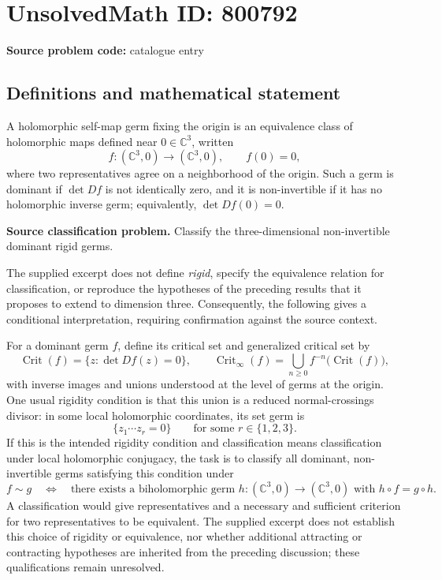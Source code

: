 \documentclass[11pt]{article}
\newcommand{\C}{\mathbb{C}}
\begin{document}
\section*{UnsolvedMath ID: 800792}
\textbf{Source problem code:} catalogue entry
\subsection{Definitions and mathematical statement}
A holomorphic self-map germ fixing the origin is an equivalence class of holomorphic maps defined near \(0\in\C^3\), written
\[
f:(\C^3,0)\longrightarrow(\C^3,0),\qquad f(0)=0,
\]
where two representatives agree on a neighborhood of the origin. Such a germ is dominant if \(\det Df\) is not identically zero, and it is non-invertible if it has no holomorphic inverse germ; equivalently, \(\det Df(0)=0\).

\textbf{Source classification problem.} Classify the three-dimensional non-invertible dominant rigid germs.

The supplied excerpt does not define \emph{rigid}, specify the equivalence relation for classification, or reproduce the hypotheses of the preceding results that it proposes to extend to dimension three. Consequently, the following gives a conditional interpretation, requiring confirmation against the source context.

For a dominant germ \(f\), define its critical set and generalized critical set by
\[
\operatorname{Crit}(f)=\{z:\det Df(z)=0\},\qquad
\operatorname{Crit}_{\infty}(f)=\bigcup_{n\geq 0}f^{-n}\bigl(\operatorname{Crit}(f)\bigr),
\]
with inverse images and unions understood at the level of germs at the origin. One usual rigidity condition is that this union is a reduced normal-crossings divisor: in some local holomorphic coordinates, its set germ is
\[
\{z_1\cdots z_r=0\}\qquad\text{for some }r\in\{1,2,3\}.
\]
If this is the intended rigidity condition and classification means classification under local holomorphic conjugacy, the task is to classify all dominant, non-invertible germs satisfying this condition under
\[
f\sim g
\quad\Longleftrightarrow\quad
\text{there exists a biholomorphic germ }h:(\C^3,0)\to(\C^3,0)
\text{ with }h\circ f=g\circ h.
\]
A classification would give representatives and a necessary and sufficient criterion for two representatives to be equivalent. The supplied excerpt does not establish this choice of rigidity or equivalence, nor whether additional attracting or contracting hypotheses are inherited from the preceding discussion; these qualifications remain unresolved.
\end{document}
